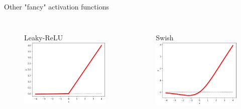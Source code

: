 \documentclass[handout]{beamer}
\begin{document}
\begin{frame}{Other "fancy" activation functions}
\begin{columns}
    \begin{figure}
        \centering
        Leaky-ReLU\\
        \includegraphics[width=.85\textwidth]{fig/L2/activ-l-relu.png}\\
      

    \end{figure}
    \begin{figure}
     \centering
        Swish\\
        \includegraphics[width=.85\textwidth]{fig/L2/activ-swish.png}\\
     

    \end{figure}
\end{columns}
\end{frame}
\end{document}
